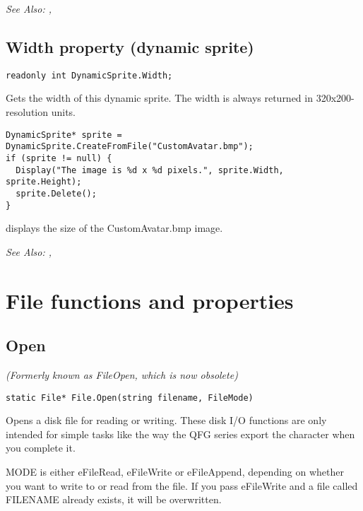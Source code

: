 \it{See Also:} ,


\subsection{Width property (dynamic sprite)}\label{DynamicSprite.Width}%

\begin{verbatim}
readonly int DynamicSprite.Width;
\end{verbatim}
Gets the width of this dynamic sprite. The width is always returned in 320x200-resolution units.

\begin{verbatim}
DynamicSprite* sprite = DynamicSprite.CreateFromFile("CustomAvatar.bmp");
if (sprite != null) {
  Display("The image is %d x %d pixels.", sprite.Width, sprite.Height);
  sprite.Delete();
}
\end{verbatim}
displays the size of the CustomAvatar.bmp image.

\it{See Also:} ,



\section{File functions and properties}%


\subsection{Open}\label{File.Open}%

\it{(Formerly known as FileOpen, which is now obsolete)}

\begin{verbatim}
static File* File.Open(string filename, FileMode)
\end{verbatim}
Opens a disk file for reading or writing. These disk I/O functions are only
intended for simple tasks like the way the QFG series export the character
when you complete it.

MODE is either eFileRead, eFileWrite or eFileAppend, depending on
whether you want to write to or read from the file. If you pass eFileWrite
and a file called FILENAME already exists, it will be overwritten.

